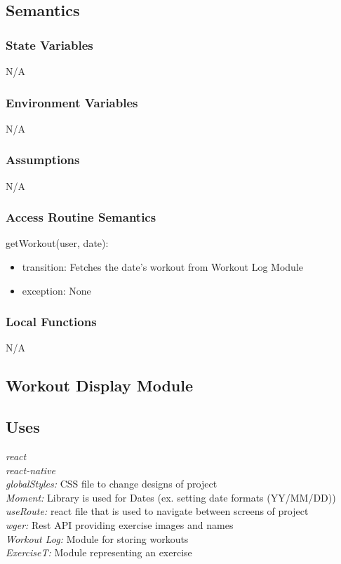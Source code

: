 \documentclass[12pt, titlepage]{article}
\begin{document}
\subsection{Semantics}

\subsubsection{State Variables}

N/A

\subsubsection{Environment Variables}

N/A

\subsubsection{Assumptions}

N/A

\subsubsection{Access Routine Semantics}

\noindent getWorkout(user, date):
\begin{itemize}
	\item transition: Fetches the date's workout from Workout Log Module
	\item exception: None
\end{itemize}

\subsubsection{Local Functions}

N/A

\subsection{Workout Display Module}

\subsection{Uses}
{\textit{react}}\\
{\textit{react-native}}\\
{\textit{globalStyles:} CSS file to change designs of project}\\
{\textit{Moment:} Library is used for Dates (ex. setting date formats (YY/MM/DD))}\\
{\textit{useRoute:} react file that is used to navigate between screens of project}\\
{\textit{wger:} Rest API providing exercise images and names}\\
{\textit{Workout Log:} Module for storing workouts}\\
{\textit{ExerciseT:} Module representing an exercise}\\
\end{document}
